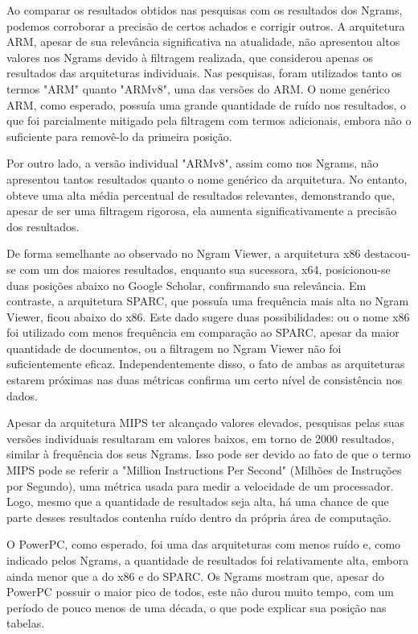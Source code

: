 \documentclass[
	article,			%
	11pt,				%
	oneside,			%
	a4paper,			%
	english,			%
	brazil,				%
	sumario=tradicional
	]{abntex2}
\begin{document}
Ao comparar os resultados obtidos nas pesquisas com os resultados dos Ngrams, podemos corroborar a precisão de certos achados e corrigir outros. A arquitetura ARM, apesar de sua relevância significativa na atualidade, não apresentou altos valores nos Ngrams devido à filtragem realizada, que considerou apenas os resultados das arquiteturas individuais. Nas pesquisas, foram utilizados tanto os termos "ARM" quanto "ARMv8", uma das versões do ARM. O nome genérico ARM, como esperado, possuía uma grande quantidade de ruído nos resultados, o que foi parcialmente mitigado pela filtragem com termos adicionais, embora não o suficiente para removê-lo da primeira posição.

Por outro lado, a versão individual "ARMv8", assim como nos Ngrams, não apresentou tantos resultados quanto o nome genérico da arquitetura. No entanto, obteve uma alta média percentual de resultados relevantes, demonstrando que, apesar de ser uma filtragem rigorosa, ela aumenta significativamente a precisão dos resultados.

De forma semelhante ao observado no Ngram Viewer, a arquitetura x86 destacou-se com um dos maiores resultados, enquanto sua sucessora, x64, posicionou-se duas posições abaixo no Google Scholar, confirmando sua relevância. Em contraste, a arquitetura SPARC, que possuía uma frequência mais alta no Ngram Viewer, ficou abaixo do x86. Este dado sugere duas possibilidades: ou o nome x86 foi utilizado com menos frequência em comparação ao SPARC, apesar da maior quantidade de documentos, ou a filtragem no Ngram Viewer não foi suficientemente eficaz. Independentemente disso, o fato de ambas as arquiteturas estarem próximas nas duas métricas confirma um certo nível de consistência nos dados.

Apesar da arquitetura MIPS ter alcançado valores elevados, pesquisas pelas suas versões individuais resultaram em valores baixos, em torno de 2000 resultados, similar à frequência dos seus Ngrams. Isso pode ser devido ao fato de que o termo MIPS pode se referir a "Million Instructions Per Second" (Milhões de Instruções por Segundo), uma métrica usada para medir a velocidade de um processador. Logo, mesmo que a quantidade de resultados seja alta, há uma chance de que parte desses resultados contenha ruído dentro da própria área de computação.

O PowerPC, como esperado, foi uma das arquiteturas com menos ruído e, como indicado pelos Ngrams, a quantidade de resultados foi relativamente alta, embora ainda menor que a do x86 e do SPARC. Os Ngrams mostram que, apesar do PowerPC possuir o maior pico de todos, este não durou muito tempo, com um período de pouco menos de uma década, o que pode explicar sua posição nas tabelas.
\end{document}
